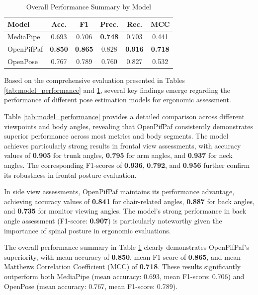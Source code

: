 \documentclass[lettersize,journal]{IEEEtran}
\begin{document}
\begin{table}[htbp]
\centering
\caption{Overall Performance Summary by Model}
\label{tab:overall_summary}
\small
\begin{tabular}{@{}l c c c c c@{}}
\toprule
\textbf{Model} & \textbf{Acc.} & \textbf{F1} & \textbf{Prec.} & \textbf{Rec.} & \textbf{MCC} \\
\midrule
MediaPipe & 0.693 & 0.706 & \textbf{0.748} & 0.703 & 0.441 \\
OpenPifPaf & \textbf{0.850} & \textbf{0.865} & 0.828 & \textbf{0.916} & \textbf{0.718} \\
OpenPose & 0.767 & 0.789 & 0.760 & 0.827 & 0.532 \\
\bottomrule
\end{tabular}
\end{table}

Based on the comprehensive evaluation presented in Tables \ref{tab:model_performance} and \ref{tab:overall_summary}, several key findings emerge regarding the performance of different pose estimation models for ergonomic assessment.

Table \ref{tab:model_performance} provides a detailed comparison across different viewpoints and body angles, revealing that OpenPifPaf consistently demonstrates superior performance across most metrics and body segments. The model achieves particularly strong results in frontal view assessments, with accuracy values of \textbf{0.905} for trunk angles, \textbf{0.795} for arm angles, and \textbf{0.937} for neck angles. The corresponding F1-scores of \textbf{0.936}, \textbf{0.792}, and \textbf{0.956} further confirm its robustness in frontal posture evaluation.

In side view assessments, OpenPifPaf maintains its performance advantage, achieving accuracy values of \textbf{0.841} for chair-related angles, \textbf{0.887} for back angles, and \textbf{0.735} for monitor viewing angles. The model's strong performance in back angle assessment (F1-score: \textbf{0.907}) is particularly noteworthy given the importance of spinal posture in ergonomic evaluations.

The overall performance summary in Table \ref{tab:overall_summary} clearly demonstrates OpenPifPaf's superiority, with mean accuracy of \textbf{0.850}, mean F1-score of \textbf{0.865}, and mean Matthews Correlation Coefficient (MCC) of \textbf{0.718}. These results significantly outperform both MediaPipe (mean accuracy: 0.693, mean F1-score: 0.706) and OpenPose (mean accuracy: 0.767, mean F1-score: 0.789).
\end{document}
